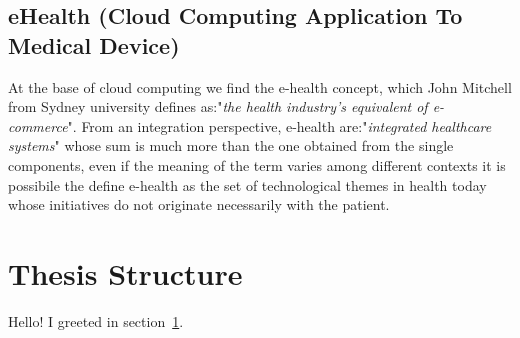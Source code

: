 \subsection{eHealth (Cloud Computing Application To Medical Device)}
At the base of cloud computing we find the e-health concept, which John Mitchell from Sydney university defines as:"\textit{the health industry's equivalent of e-commerce}". From an integration perspective, e-health are:"\textit{integrated healthcare systems}" whose sum is much more than the one obtained from the single components, even if the meaning of the term varies among different contexts \cite{Eysenbach} it is possibile the define e-health as the set of technological themes in health today whose initiatives do not originate necessarily with the patient. \cite{oh}
\cite{DellaMea}

\section{Thesis Structure}
\label{sec:greetings}

Hello!
I greeted in section~\ref{sec:greetings}.